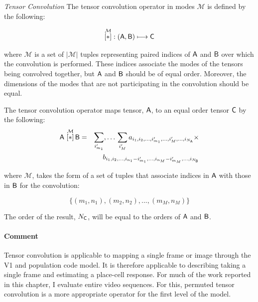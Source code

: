 \begin{definition}{\textit{Tensor Convolution}}\label{def:convop}  The tensor convolution operator in modes $\mathcal{M}$ is defined by the following:

\begin{equation}
 \overset{\mathcal{M}}{[ \ast ]}: \left (\mathsf{A},\mathsf{B}  \right ) \longmapsto \mathsf{C}
\end{equation}

 where $\mathcal{M}$ is a set of $|\mathcal{M}|$ tuples representing paired indices of $\mathsf{A}$ and $\mathsf{B}$ over which the convolution is performed.   These indices associate the modes of the tensors being convolved together, but $\mathsf{A}$ and $\mathsf{B}$ should be of equal order. Moreover, the dimensions of the modes that are not participating in the convolution should be equal.

The tensor convolution operator maps tensor, $\mathsf{A}$, to an equal order tensor $\mathsf{C}$ by the following:
\begin{eqnarray}
\mathsf{A}\,\, \overset{\mathcal{M}}{[ \ast ]}\, {\mathsf{B}} &=& \sum_{i'_{m_1}},\ldots\,\sum_{i_{M}'}   
a_{i_1,i_2,...,i_{m_1}',...,i_{M}',...,i_{N_{\mathsf{A}}}} \times \nonumber \\
& &b_{i_1,i_2,...,i_{n_1}-i_{m_1}',...,i_{n_M}-i_{m_M}',...,i_{N_{\mathsf{B}}}}
\label{eq:t1}
\end{eqnarray}

where $\mathcal{M}$, takes the form of a set of tuples that associate indices in $\mathsf{A}$ with those in $\mathsf{B}$ for the convolution:

\begin{equation}
\lbrace(m_1,n_1),(m_2,n_2),...,(m_{M},n_{M})\rbrace
\end{equation}

The order of the result, $N_{\mathsf{C}}$, will be equal to the orders of $\mathsf{A}$ and $\mathsf{B}$.
\end{definition}

\paragraph{Comment}  Tensor convolution is applicable to mapping a single frame or image through the V1 and population code model.  It is therefore applicable to describing taking a single frame and estimating a place-cell response.  For much of the work reported in this chapter, I evaluate entire video sequences. For this, permuted tensor convolution is a more appropriate operator for the first level of the model.


